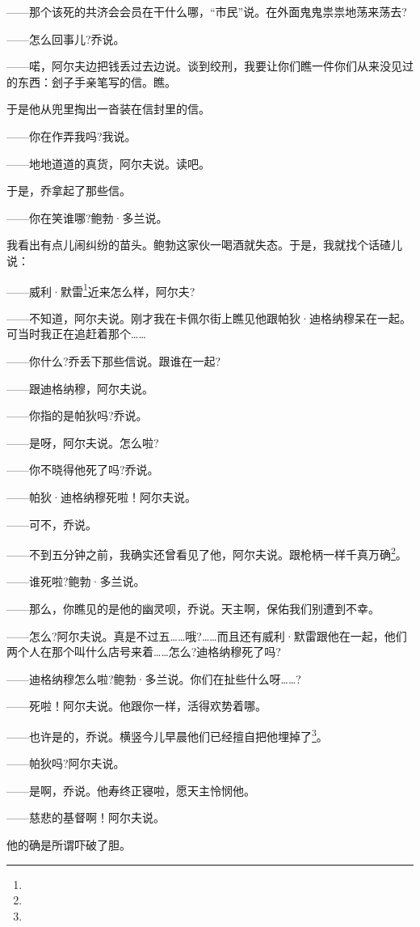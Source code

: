 \par ——那个该死的共济会会员在干什么哪，“市民”说。在外面鬼鬼祟祟地荡来荡去?
\par ——怎么回事儿?乔说。
\par ——喏，阿尔夫边把钱丢过去边说。谈到绞刑，我要让你们瞧一件你们从来没见过的东西：刽子手亲笔写的信。瞧。
\par 于是他从兜里掏出一沓装在信封里的信。
\par ——你在作弄我吗?我说。
\par ——地地道道的真货，阿尔夫说。读吧。
\par 于是，乔拿起了那些信。
\par ——你在笑谁哪?鲍勃·多兰说。
\par 我看出有点儿闹纠纷的苗头。鲍勃这家伙一喝酒就失态。于是，我就找个话碴儿说：
\par ——威利·默雷\footnote{}近来怎么样，阿尔夫?
\par ——不知道，阿尔夫说。刚才我在卡佩尔街上瞧见他跟帕狄·迪格纳穆呆在一起。可当时我正在追赶着那个……
\par ——你什么?乔丢下那些信说。跟谁在一起?
\par ——跟迪格纳穆，阿尔夫说。
\par ——你指的是帕狄吗?乔说。
\par ——是呀，阿尔夫说。怎么啦?
\par ——你不晓得他死了吗?乔说。
\par ——帕狄·迪格纳穆死啦！阿尔夫说。
\par ——可不，乔说。
\par ——不到五分钟之前，我确实还曾看见了他，阿尔夫说。跟枪柄一样千真万确\footnote{}。
\par ——谁死啦?鲍勃·多兰说。
\par ——那么，你瞧见的是他的幽灵呗，乔说。天主啊，保佑我们别遭到不幸。
\par ——怎么?阿尔夫说。真是不过五……哦?……而且还有威利·默雷跟他在一起，他们两个人在那个叫什么店号来着……怎么?迪格纳穆死了吗?
\par ——迪格纳穆怎么啦?鲍勃·多兰说。你们在扯些什么呀……?
\par ——死啦！阿尔夫说。他跟你一样，活得欢势着哪。
\par ——也许是的，乔说。横竖今儿早晨他们已经擅自把他埋掉了\footnote{}。
\par ——帕狄吗?阿尔夫说。
\par ——是啊，乔说。他寿终正寝啦，愿天主怜悯他。
\par ——慈悲的基督啊！阿尔夫说。
\par 他的确是所谓吓破了胆。
